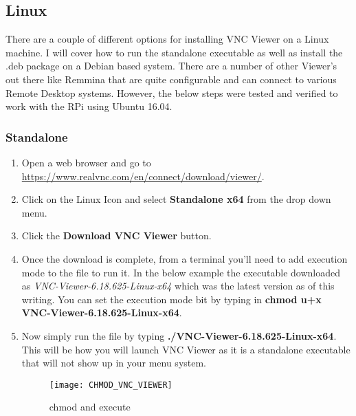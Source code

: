 \documentclass[
a4paper,
fontsize=14pt, %
pagesize, %
parskip=half-, %
]{scrartcl} %
\theoremstyle{mythmstyle} %
\begin{document}
\subsection{Linux}
There are a couple of different options for installing VNC Viewer on a Linux machine.  I will cover how to run the standalone executable as well as install the .deb package on a Debian based system.  There are a number of other Viewer's out there like Remmina that are quite configurable and can connect to various Remote Desktop systems.  However, the below steps were tested and verified to work with the RPi using Ubuntu 16.04.
\subsubsection{Standalone}
\begin{enumerate}
    \item Open a web browser and go to \url{https://www.realvnc.com/en/connect/download/viewer/}.
    \item Click on the Linux Icon and select \textbf{Standalone x64} from the drop down menu.
    \item Click the \textbf{Download VNC Viewer} button.
    \item Once the download is complete, from a terminal you'll need to add execution mode to the file to run it.  In the below example the executable downloaded as \emph{VNC-Viewer-6.18.625-Linux-x64} which was the latest version as of this writing.  You can set the execution mode bit by typing in \textbf{chmod u+x  VNC-Viewer-6.18.625-Linux-x64}.
    \item Now simply run the file by typing \textbf{./VNC-Viewer-6.18.625-Linux-x64}.  This will be how you will launch VNC Viewer as it is a standalone executable that will not show up in your menu system.
    \begin{figure}[h]
        \centering\texttt{[image: CHMOD\_VNC\_VIEWER]}
        \caption{chmod and execute}
    \end{figure}
\end{enumerate}
\end{document}
